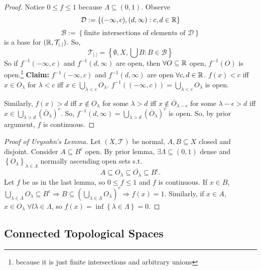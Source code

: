 \begin{proof}
    Notice $0 \leq f \leq 1$ because $\Lambda \subseteq (0, 1)$.
    Observe \[
    \mathcal{D} := \left\{ (-\infty, c), (d, \infty) : c, d \in \mathbb{R} \right\} 
    \]
    \[
        \mathcal{B} := \left\{ \text{finite intersections of elements of } \mathcal{D} \right\} 
    \]  
    is a base for $(\mathbb{R}, \mathcal{T}_{\left| . \right| })$.
    So,
    \[
        \mathcal{T}_{\left| . \right| } = \left\{ \emptyset, X, \bigcup B : B \in \mathcal{B} \right\} 
    \] 
    So if $f^{-1}(-\infty, c)$ and $f^{-1}(d, \infty)$ are open, then $\forall O \subseteq \mathbb{R}$ open,
    $f^{-1}(O)$ is open.\footnote{because it is just finite intersections and arbitrary unions}    
    \newline \noindent \textbf{Claim:} $f^{-1}(-\infty, c)$ and $f^{-1}(d, \infty)$ are open 
    $\forall c,d \in \mathbb{R}$.
    \newline \noindent $f(x) < c$ iff $x \in O_\lambda $ for $\lambda < c$ iff $x \in 
    \bigcup_{\lambda < c} O_\lambda$. $f^{-1}((-\infty, c)) = \bigcup_{\lambda < c} O_\lambda$ is open.
    
    Similarly, $f(x) > d$ iff $x \notin O_\lambda$ for some $\lambda > d$ iff $
    x \notin \overline{O}_{\lambda - \epsilon}$ for some $\lambda - \epsilon > d$ iff
    $x \in \bigcup_{\lambda > d} (\overline{O}_\lambda)^c$.
    So, $f^{-1}(d, \infty) = \bigcup_{\lambda > d} (\overline{O}_\lambda)^c$ is open.
    So, by prior argument, $f$ is continuous. \qedhere            
\end{proof}

\begin{proof}[Proof of Urysohn's Lemma]
    Let $(X, \mathcal{T})$ be normal, $A, B \subseteq X$ closed and disjoint. Consider 
    $A \subseteq B^c $ open. By prior lemma, $\exists \Lambda \subseteq (0, 1)$ dense and 
    $\left\{ O_\lambda \right\}_{\lambda \in \Lambda}$ normally ascending open sets s.t.
    \[
        A \subseteq O_\lambda \subseteq \overline{O_\lambda} \subseteq B^c.
    \]
    Let $f$ be as in the last lemma, so $0 \leq f \leq 1$ and $f$ is continuous. 
    If $x \in B$, $\bigcup_{\lambda \in \Lambda} O_\lambda \subseteq B^c \Rightarrow B \subseteq 
    (\bigcup_{\lambda \in \Lambda} O_\lambda)^c \Rightarrow f(x) = 1$. 
    Similarly, if $x \in A$, $x \in O_\lambda \; \forall l\lambda \in \Lambda$, so 
    $f(x) = \inf \left\{ \lambda \in \Lambda \right\} = 0$. \qedhere  
\end{proof}


\subsection{Connected Topological Spaces} 


